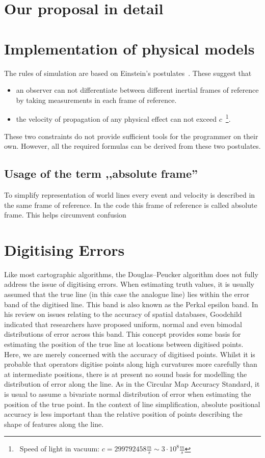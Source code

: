 \documentclass{egpubl}
\begin{document}
\section{Our proposal in detail}

%
%

\section{Implementation of physical models}
The rules of simulation are based on Einstein's postulates~\cite{EinsteinElectrodynamics}. These suggest that
\begin{itemize}
\item an observer can not differentiate between different inertial frames of reference by taking measurements in each frame of reference.
\item the velocity of propagation of any physical effect can not exceed
$c$~\footnote{~Speed of light in vacuum:
$c=299792458 \frac{m}{s} \sim 3 \cdot 10^8 \frac{m}{s}$}.
 \end{itemize}
These two constraints do not provide sufficient tools for the programmer on their own. However, all the required formulas can be derived from these two postulates.

\subsection{Usage of the term ,,absolute frame''}
To simplify representation of world lines every event and velocity is described in the same frame of reference. In the code this frame of reference is called absolute frame. This helps circumvent confusion 



\section{Digitising Errors}
\label{sec:digErr}

Like most cartographic algorithms, the Douglas--Peucker algorithm does not
fully address the issue of digitising errors. When estimating truth values,
it is usually assumed that the true line (in this case the analogue line)
lies within the error band of the digitised line. This band is also known as
the Perkal epsilon band. In his review on issues relating to the accuracy of
spatial databases, Goodchild\cite{Lev90} indicated that researchers have
proposed uniform, normal and even bimodal distributions of error across this
band. This concept provides some basis for estimating the position of the
true line at locations between digitised points. Here, we are merely
concerned with the accuracy of digitised points. Whilst it is probable that
operators digitise points along high curvatures more carefully than at
intermediate positions, there is at present no sound basis for modelling the
distribution of error along the line. As in the Circular Map Accuracy
Standard, it is usual to assume a bivariate normal distribution of error when
estimating the position of the true point. In the context of line
simplification, absolute positional accuracy is less important than the
relative position of points describing the shape of features along the line.
\end{document}
